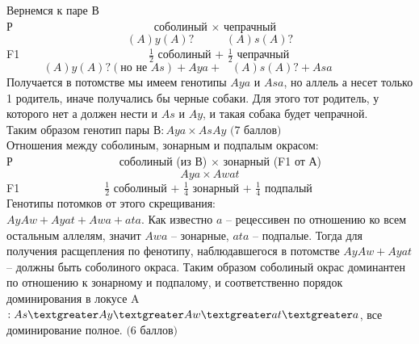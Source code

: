 Вернемся к паре В\\
Р$\hspace{150pt}$соболиный $\times$ чепрачный
$$(A)y(A)?\hspace{34pt}(A)s(A)?$$
F1$\hspace{137pt}\frac{1}{2}$ соболиный $+$ $\frac{1}{2}$ чепрачный
$$(A)y(A)?(\text{но не }As)+Aya+\hspace{10pt}(A)s(A)?+Asa\hspace{47pt}$$
Получается в потомстве мы имеем генотипы $Aya$ и $Asa$, но аллель а несет только 1 родитель, иначе получались бы черные собаки. Для этого тот родитель, у которого нет а должен нести и $As$ и $Ay$, и такая собака будет чепрачной.\\
Таким образом генотип пары В$:Aya\times AsAy$ $\textit{(7 баллов)}$\\
Отношения между соболиным, зонарным и подпалым окрасом:\\
Р$\hspace{113pt}$соболиный (из В) $\times$ зонарный (F1 от А)
$$Aya\times Awat$$
F1$\hspace{90pt}\frac{1}{2}$ соболиный $+$ $\frac{1}{4}$ зонарный $+$ $\frac{1}{4}$ подпалый\\
Генотипы потомков от этого скрещивания:\\
$AyAw+Ayat+Awa+ata$. Как известно $a$ – рецессивен по отношению ко всем остальным аллелям, значит $Awa$ – зонарные, $ata$ – подпалые. Тогда для получения расщепления по фенотипу, наблюдавшегося в потомстве $AyAw+Ayat$ – должны быть соболиного окраса. Таким образом соболиный окрас доминантен по отношению к зонарному и подпалому, и соответственно порядок доминирования в локусе A$:As\textgreater Ay\textgreater Aw\textgreater at\textgreater a$, все доминирование полное. $\textit{(6 баллов)}$\\
